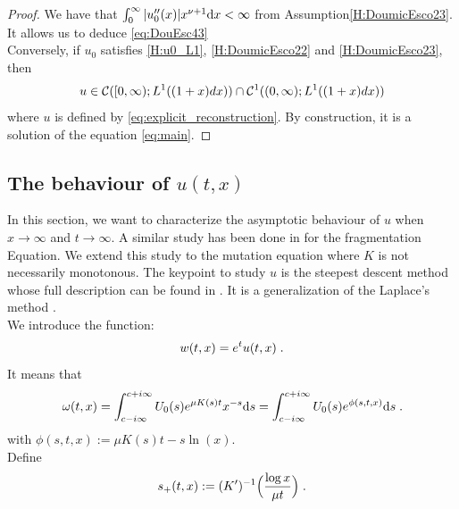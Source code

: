 \documentclass[11pt]{amsart}
\begin{document}
\begin{proof}
    We have that $\int_0^\infty |u_0''(x)| x^{\nu + 1} \mathrm dx < \infty$ from Assumption\eqref{H:DoumicEsco23}. It allows us to deduce \eqref{eq:DouEsc43} \\
    
    Conversely, if $u_0$ satisfies \eqref{H:u0_L1}, \eqref{H:DoumicEsco22} and \eqref{H:DoumicEsco23}, then 
     $$u \in \mathcal{C}([0, \infty); L^1((1+x)dx)) \cap \mathcal{C}^1((0, \infty); L^1((1+x)dx))$$
    where $u$ is defined by \eqref{eq:explicit_reconstruction}. By construction, it is a solution of the equation \eqref{eq:main}.
    \end{proof}

\subsection{The behaviour of $u(t,x)$}\mbox{}

In this section, we want to characterize the asymptotic behaviour of $u$ when $x \to \infty$ and $t \to \infty$. A similar study has been done in \cite{doumic2016time} for the fragmentation Equation. We extend this study to the mutation equation where $K$ is not necessarily monotonous.
The keypoint to study $u$ is the steepest descent method whose full description can be found in \cite{dieudonne1980calcul,debye1909naherungsformeln}. It is a generalization of the Laplace's method \cite{laplace1986memoir}. \\

We introduce the function: 
    \begin{align*}
        w(t,x) = e^t u(t,x)
        \; .
    \end{align*}
It means that
    \begin{equation*}
        \omega(t,x)
        = \int_{c-i\infty}^{c+i\infty} U_0(s) e^{\mu K(s)t}x^{-s} \mathrm ds
        =  \int_{c-i\infty}^{c+i\infty} U_0(s) e^{\phi(s, t, x)} \mathrm ds
        \; .
    \end{equation*}
with $\phi(s,t,x) := \mu K(s) t - s \ln(x) $.\\


Define $$ s_+(t,x) := (K')^{-1} \Big( \frac{\log x}{\mu t} \Big) \; .$$
\end{document}
